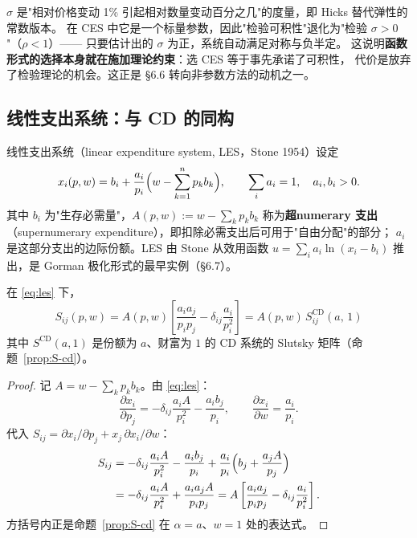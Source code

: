 \begin{remark}
$\sigma$ 是"相对价格变动 1\% 引起相对数量变动百分之几"的度量，即 Hicks 替代弹性的常数版本。
在 CES 中它是一个标量参数，因此"检验可积性"退化为"检验 $\sigma>0$"（$\rho<1$）——
只要估计出的 $\sigma$ 为正，系统自动满足对称与负半定。
这说明\textbf{函数形式的选择本身就在施加理论约束}：选 CES 等于事先承诺了可积性，
代价是放弃了检验理论的机会。这正是 \S 6.6 转向非参数方法的动机之一。
\end{remark}

\subsection{线性支出系统：与 CD 的同构}

线性支出系统（linear expenditure system, LES，Stone 1954）设定
\begin{equation}\label{eq:les}
 x_i(p,w)=b_i+\frac{a_i}{p_i}\Bigl(w-\sum_{k=1}^{n}p_kb_k\Bigr),\qquad
 \sum_i a_i=1,\quad a_i,b_i>0.
\end{equation}
其中 $b_i$ 为"生存必需量"，$A(p,w):=w-\sum_k p_kb_k$ 称为\textbf{超numerary 支出}
（supernumerary expenditure），即扣除必需支出后可用于"自由分配"的部分；
$a_i$ 是这部分支出的边际份额。LES 由 Stone 从效用函数
$u=\sum_i a_i\ln(x_i-b_i)$ 推出，是 Gorman 极化形式的最早实例（\S 6.7）。

\begin{proposition}\label{prop:S-les}
在 \eqref{eq:les} 下，
\[
 \boxed{\;S_{ij}(p,w)=A(p,w)\left[\frac{a_ia_j}{p_ip_j}-\delta_{ij}\frac{a_i}{p_i^{2}}\right]
 =A(p,w)\,S^{\mathrm{CD}}_{ij}(a,\,1)\;}
\]
其中 $S^{\mathrm{CD}}(a,1)$ 是份额为 $a$、财富为 $1$ 的 CD 系统的 Slutsky 矩阵（命题~\ref{prop:S-cd}）。
\end{proposition}

\begin{proof}
记 $A=w-\sum_kp_kb_k$。由 \eqref{eq:les}：
\[
 \frac{\partial x_i}{\partial p_j}=-\delta_{ij}\frac{a_iA}{p_i^{2}}-\frac{a_ib_j}{p_i},
 \qquad
 \frac{\partial x_i}{\partial w}=\frac{a_i}{p_i}.
\]
代入 $S_{ij}=\partial x_i/\partial p_j+x_j\,\partial x_i/\partial w$：
\begin{align*}
S_{ij}&=-\delta_{ij}\frac{a_iA}{p_i^{2}}-\frac{a_ib_j}{p_i}
 +\frac{a_i}{p_i}\Bigl(b_j+\frac{a_jA}{p_j}\Bigr)\\
&=-\delta_{ij}\frac{a_iA}{p_i^{2}}+\frac{a_ia_jA}{p_ip_j}
=A\left[\frac{a_ia_j}{p_ip_j}-\delta_{ij}\frac{a_i}{p_i^{2}}\right].
\end{align*}
方括号内正是命题~\ref{prop:S-cd} 在 $\alpha=a$、$w=1$ 处的表达式。
\end{proof}

